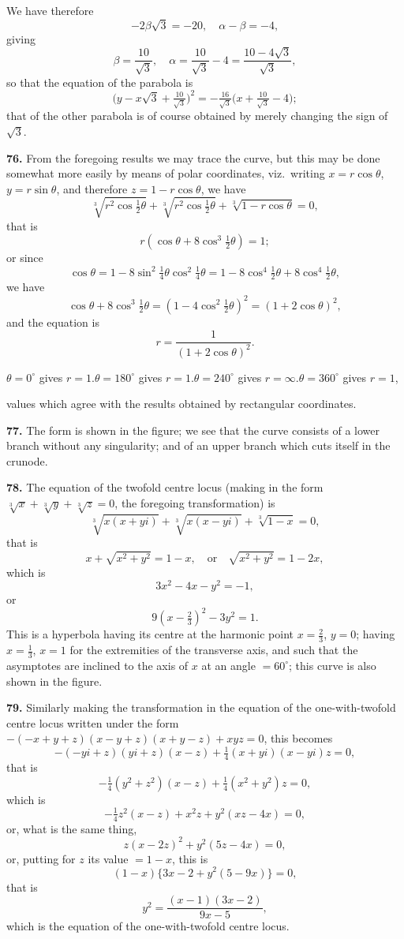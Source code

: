 \documentclass[11pt,a4paper]{article}
\theoremstyle{plain}
\begin{document}
We have therefore
\[
-2\beta\sqrt{3} = -20, \quad \alpha - \beta = -4,
\]
giving
\[
\beta = \frac{10}{\sqrt{3}}, \quad \alpha = \frac{10}{\sqrt{3}} - 4 = \frac{10 - 4\sqrt{3}}{\sqrt{3}},
\]
so that the equation of the parabola is
\[
\bigl(y - x\sqrt{3} + \tfrac{10}{\sqrt{3}}\bigr)^2 = -\tfrac{16}{\sqrt{3}}\bigl(x + \tfrac{10}{\sqrt{3}} - 4\bigr);
\]
that of the other parabola is of course obtained by merely changing the sign of $\sqrt{3}$.

\noindent\textbf{76.} From the foregoing results we may trace the curve, but this may be done somewhat more easily by means of polar coordinates, viz.\ writing $x = r\cos\theta$, $y = r\sin\theta$, and therefore $z = 1 - r\cos\theta$, we have
\[
\sqrt[3]{r^2\cos\tfrac{1}{2}\theta} + \sqrt[3]{r^2\cos\tfrac{1}{2}\theta} + \sqrt[3]{1 - r\cos\theta} = 0,
\]
that is
\[
r(\cos\theta + 8\cos^3\tfrac{1}{2}\theta) = 1;
\]
or since
\[
\cos\theta = 1 - 8\sin^2\tfrac{1}{4}\theta\cos^2\tfrac{1}{4}\theta = 1 - 8\cos^4\tfrac{1}{2}\theta + 8\cos^4\tfrac{1}{2}\theta,
\]
we have
\[
\cos\theta + 8\cos^3\tfrac{1}{2}\theta = (1 - 4\cos^2\tfrac{1}{2}\theta)^2 = (1 + 2\cos\theta)^2,
\]
and the equation is
\[
r = \frac{1}{(1 + 2\cos\theta)^2}.
\]

$\theta = 0^{\circ}$ gives $r = 1$.\quad $\theta = 180^{\circ}$ gives $r = 1$.\quad $\theta = 240^{\circ}$ gives $r = \infty$.\quad $\theta = 360^{\circ}$ gives $r = 1$,

values which agree with the results obtained by rectangular coordinates.

\noindent\textbf{77.} The form is shown in the figure; we see that the curve consists of a lower branch without any singularity; and of an upper branch which cuts itself in the crunode.

\noindent\textbf{78.} The equation of the twofold centre locus (making in the form $\sqrt[3]{x} + \sqrt[3]{y} + \sqrt[3]{z} = 0$, the foregoing transformation) is
\[
\sqrt[3]{x(x+yi)} + \sqrt[3]{x(x-yi)} + \sqrt[3]{1-x} = 0,
\]
that is
\[
x + \sqrt{x^2+y^2} = 1-x, \quad \text{or} \quad \sqrt{x^2+y^2} = 1-2x,
\]
which is
\[
3x^2 - 4x - y^2 = -1,
\]
or
\[
9(x - \tfrac{2}{3})^2 - 3y^2 = 1.
\]
This is a hyperbola having its centre at the harmonic point $x = \tfrac{2}{3}$, $y = 0$; having $x = \tfrac{1}{3}$, $x = 1$ for the extremities of the transverse axis, and such that the asymptotes are inclined to the axis of $x$ at an angle $= 60^{\circ}$; this curve is also shown in the figure.

\noindent\textbf{79.} Similarly making the transformation in the equation of the one-with-twofold centre locus written under the form $-(-x+y+z)(x-y+z)(x+y-z) + xyz = 0$, this becomes
\[
-(-yi+z)(yi+z)(x-z) + \tfrac{1}{4}(x+yi)(x-yi)z = 0,
\]
that is
\[
-\tfrac{1}{4}(y^2+z^2)(x-z) + \tfrac{1}{4}(x^2+y^2)z = 0,
\]
which is
\[
-\tfrac{1}{4}z^2(x-z) + x^2z + y^2(xz - 4x) = 0,
\]
or, what is the same thing,
\[
z(x-2z)^2 + y^2(5z-4x) = 0,
\]
or, putting for $z$ its value $= 1-x$, this is
\[
(1-x)\{3x - 2 + y^2(5-9x)\} = 0,
\]
that is
\[
y^2 = \frac{(x-1)(3x-2)}{9x-5},
\]
which is the equation of the one-with-twofold centre locus.
\end{document}
